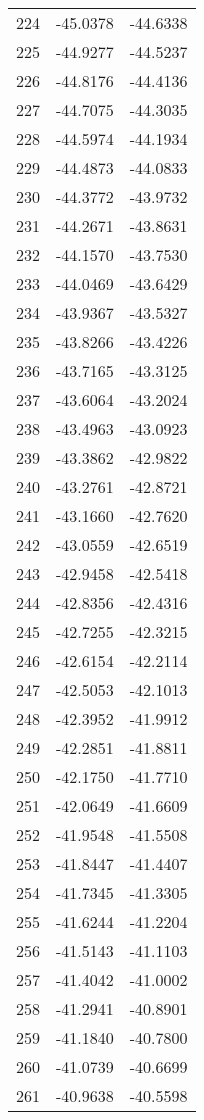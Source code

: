 \documentclass{article}
\begin{document}
\begin{longtable}{|c|c|c|}
224 & -45.0378 & -44.6338 \\
225 & -44.9277 & -44.5237 \\
226 & -44.8176 & -44.4136 \\
227 & -44.7075 & -44.3035 \\
228 & -44.5974 & -44.1934 \\
229 & -44.4873 & -44.0833 \\
230 & -44.3772 & -43.9732 \\
231 & -44.2671 & -43.8631 \\
232 & -44.1570 & -43.7530 \\
233 & -44.0469 & -43.6429 \\
234 & -43.9367 & -43.5327 \\
235 & -43.8266 & -43.4226 \\
236 & -43.7165 & -43.3125 \\
237 & -43.6064 & -43.2024 \\
238 & -43.4963 & -43.0923 \\
239 & -43.3862 & -42.9822 \\
240 & -43.2761 & -42.8721 \\
241 & -43.1660 & -42.7620 \\
242 & -43.0559 & -42.6519 \\
243 & -42.9458 & -42.5418 \\
244 & -42.8356 & -42.4316 \\
245 & -42.7255 & -42.3215 \\
246 & -42.6154 & -42.2114 \\
247 & -42.5053 & -42.1013 \\
248 & -42.3952 & -41.9912 \\
249 & -42.2851 & -41.8811 \\
250 & -42.1750 & -41.7710 \\
251 & -42.0649 & -41.6609 \\
252 & -41.9548 & -41.5508 \\
253 & -41.8447 & -41.4407 \\
254 & -41.7345 & -41.3305 \\
255 & -41.6244 & -41.2204 \\
256 & -41.5143 & -41.1103 \\
257 & -41.4042 & -41.0002 \\
258 & -41.2941 & -40.8901 \\
259 & -41.1840 & -40.7800 \\
260 & -41.0739 & -40.6699 \\
261 & -40.9638 & -40.5598 \\

\end{longtable}
\end{document}
